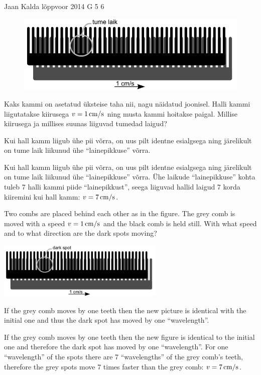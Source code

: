 {Jaan Kalda} %
{lõppvoor} %
{2014} %
{G 5} %
{6} %
{
\ifStatement
\begin{figure}%
\includegraphics[width=1\linewidth]{2014-v3g-05-kammid}
\end{figure}

Kaks kammi on asetatud üksteise taha nii, nagu näidatud joonisel. Halli kammi liigutatakse kiirusega $v=\SI 1{cm/s}$ ning musta kammi hoitakse paigal. Millise kiirusega ja millises suunas liiguvad tumedad laigud?
\fi


\ifHint
Kui hall kamm liigub ühe pii võrra, on uus pilt identne esialgsega ning järelikult on tume laik liikunud ühe \enquote{lainepikkuse} võrra.
\fi


\ifSolution
Kui hall kamm liigub ühe pii võrra, on uus pilt identne esialgsega ning järelikult on tume laik liikunud ühe \enquote{lainepikkuse} võrra. 
Ühe laikude \enquote{lainepikkuse} kohta tuleb 7 halli kammi piide \enquote{lainepikkust}, seega liiguvad hallid laigud 7 korda kiiremini kui hall kamm: $v=\SI 7{cm/s}$.
\fi


\ifEngStatement
Two combs are placed behind each other as in the figure. The grey comb is moved with a speed $v=\SI 1{cm/s}$ and the black comb is held still.  With what speed and to what direction are the dark spots moving?
\begin{center}
\includegraphics[width=0.6\textwidth]{2014-v3g-05-kammid_ing}
\end{center}
\fi


\ifEngHint
If the grey comb moves by one teeth then the new picture is identical with the initial one and thus the dark spot has moved by one “wavelength”.
\fi


\ifEngSolution
If the grey comb moves by one teeth then the new figure is identical to the initial one and therefore the dark spot has moved by one “wavelength”. For one “wavelength” of the spots there are 7 “wavelengths” of the grey comb’s teeth, therefore the grey spots move 7 times faster than the grey comb: $v=\SI 7{cm/s}$.
\fi
}
